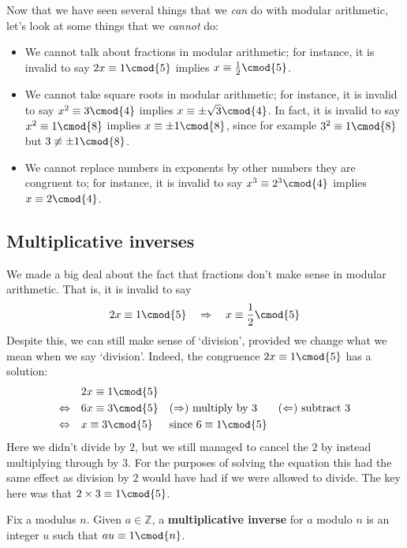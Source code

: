 \begin{example}
Now that we have seen several things that we \textit{can} do with modular arithmetic, let's look at some things that we \textit{cannot} do:
\begin{itemize}
\item We cannot talk about fractions in modular arithmetic; for instance, it is invalid to say $2x \equiv 1 \cmod{5}$ implies $x \equiv \frac{1}{2} \cmod{5}$.
\item We cannot take square roots in modular arithmetic; for instance, it is invalid to say $x^2 \equiv 3 \cmod{4}$ implies $x \equiv \pm \sqrt{3} \cmod{4}$. In fact, it is invalid to say $x^2 \equiv 1 \cmod{8}$ implies $x \equiv \pm 1 \cmod{8}$, since for example $3^2 \equiv 1 \cmod{8}$ but $3 \not\equiv \pm 1 \cmod{8}$.
\item We cannot replace numbers in exponents by other numbers they are congruent to; for instance, it is invalid to say $x^3 \equiv 2^3 \cmod{4}$ implies $x \equiv 2 \cmod{4}$.
\end{itemize}
\end{example}

\subsection*{Multiplicative inverses}

We made a big deal about the fact that fractions don't make sense in modular arithmetic. That is, it is invalid to say
\[ 2x \equiv 1 \cmod{5} \quad \Rightarrow \quad x \equiv \frac{1}{2} \cmod{5} \]
Despite this, we can still make sense of `division', provided we change what we mean when we say `division'. Indeed, the congruence $2x \equiv 1 \cmod{5}$ has a solution:
\begin{align*}
& 2x \equiv 1 \cmod{5} && && \\
\Leftrightarrow\quad & 6x \equiv 3 \cmod{5} && \text{($\Rightarrow$) multiply by $3$} && \text{($\Leftarrow$) subtract $3$} \\
\Leftrightarrow\quad & x \equiv 3 \cmod{5} && \text{since $6 \equiv 1 \cmod{5}$}
\end{align*}
Here we didn't divide by $2$, but we still managed to cancel the $2$ by instead multiplying through by $3$. For the purposes of solving the equation this had the same effect as division by $2$ would have had if we were allowed to divide. The key here was that $2 \times 3 \equiv 1 \cmod{5}$.

\begin{definition}\label{multiplicative inverse}
Fix a modulus $n$. Given $a \in \mathbb{Z}$, a \textbf{multiplicative inverse} for $a$ modulo $n$ is an integer $u$ such that $au \equiv 1 \cmod{n}$.
\end{definition}

